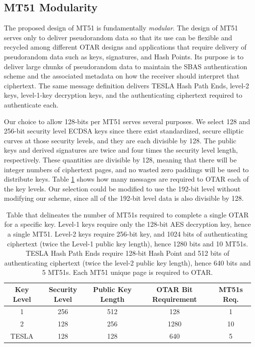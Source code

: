 \documentclass[letterpaper,times]{IONconf/IONconf}
\begin{document}
\subsection{MT51 Modularity} \label{sec: MT51 modularity}

The proposed design of MT51 is fundamentally {\em modular}.
The design of MT51 serves only to deliver pseudorandom data so that its use can be flexible and recycled among different OTAR designs and applications that require delivery of pseudorandom data such as keys, signatures, and Hash Points. 
Its purpose is to deliver large chunks of pseudorandom data to maintain the SBAS authentication scheme and the associated metadata on how the receiver should interpret that ciphertext.
The same message definition delivers TESLA Hash Path Ends, level-2 keys, level-1-key decryption keys, and the authenticating ciphertext required to authenticate each.

Our choice to allow 128-bits per MT51 serves several purposes.
We select 128 and 256-bit security level ECDSA keys since there exist standardized, secure elliptic curves at those security levels, and they are each divisible by 128.
The public keys and derived signatures are twice and four times the security level length, respectively.
These quantities are divisible by 128, meaning that there will be integer numbers of ciphertext pages, and no wasted zero paddings will be used to distribute keys.
Table \ref{tab: ciphertext lengths} shows how many messages are required to OTAR each of the key levels.
Our selection could be modified to use the 192-bit level without modifying our scheme, since all of the 192-bit level data is also divisible by 128.
\begin{table}[H]
\center
\begin{tabular}{|c|c|c|c|c|} \hline
	Key Level & Security Level & Public Key Length & OTAR Bit Requirement & MT51s Req. \\ \hline
	    1 & 256 & 512 &  128 & 1 \\ \hline
	    2 & 128 & 256 & 1280 & 10\\ \hline
	TESLA & 128 & 128 &  640 & 5 \\ \hline
\end{tabular}
\caption{Table that delineates the number of MT51s required to complete a single OTAR for a specific key. Level-1 keys require only the 128-bit AES decryption key, hence a single MT51. Level-2 keys require 256-bit key, and 1024 bits of authenticating ciphertext (twice the Level-1 public key length), hence 1280 bits and 10 MT51s. TESLA Hash Path Ends require 128-bit Hash Point and 512 bits of authenticating ciphertext (twice the level-2 public key length), hence 640 bits and 5 MT51s. Each MT51 unique page is required to OTAR.}
\label{tab: ciphertext lengths}
\end{table}
\end{document}
